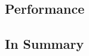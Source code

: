 \documentclass[titlepage, a4paper, 11pt]{scrartcl}
\begin{document}

        \subsection{Performance}
    


        \subsection{In Summary}

      

            
    
\end{document}
